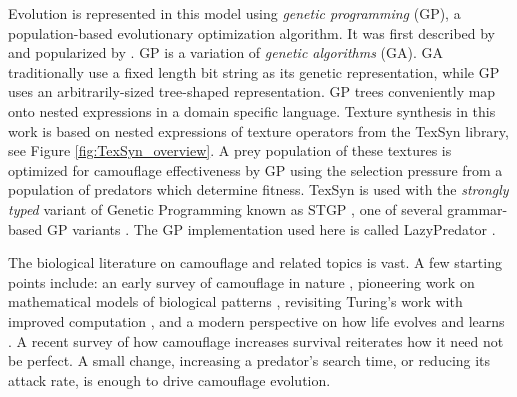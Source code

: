 \documentclass[letterpaper]{article}
\newcommand{\jargon}[1]{\textit{#1}}
\newcommand{\texsyn}[0]{TexSyn}
\newcommand{\lazypredator}[0]{LazyPredator}
\begin{document}
\par
Evolution is represented in this model using \jargon{genetic programming} (GP), a population-based evolutionary optimization algorithm. It was first described by \citet{cramer_representation_1985} and popularized by \citet{koza_genetic_1992}. GP is a variation of \jargon{genetic algorithms} (GA). GA traditionally use a fixed length bit string as its genetic representation, while GP uses an arbitrarily-sized tree-shaped representation. GP trees conveniently map onto nested expressions in a domain specific language. Texture synthesis in this work is based on nested expressions of texture operators from the \texsyn{} library, see Figure \ref{fig:TexSyn_overview}. A prey population of these textures is optimized for camouflage effectiveness by GP using the selection pressure from a population of predators which determine fitness. \texsyn{} is used with the \jargon{strongly typed} variant of Genetic Programming known as STGP \citep{montana_strongly_1995}, one of several grammar-based GP variants \citep{Mckay_2010}. The GP implementation used here is called \lazypredator{} \citep{reynolds_lazypredator_2020}.
\par
The biological literature on camouflage and related topics is vast. A few starting points include: an early survey of camouflage in nature \citep{thayer_concealing-coloration_1909}, pioneering work on mathematical models of biological patterns \citep{turing_chemical_1952}, revisiting Turing's work with improved computation \citep{murray_how_1988}, and a modern perspective on how life evolves and learns \citep{valiant_probably_2013}. A recent survey of how camouflage increases survival \citep{de_alcantara_viana_predator_2022} reiterates how it need not be perfect. A small change, increasing a predator's search time, or reducing its attack rate, is enough to drive camouflage evolution.
\par


\end{document}
